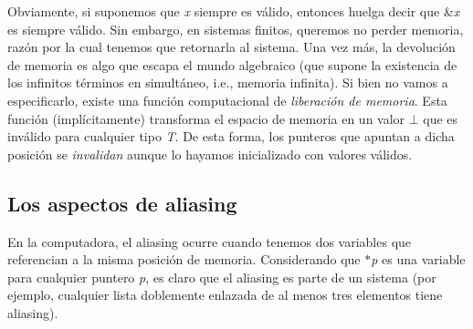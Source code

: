 \-Obviamente, si suponemos que {\itshape x\/} siempre es válido, entonces huelga decir que \&{\itshape x\/} es siempre válido. \-Sin embargo, en sistemas finitos, queremos no perder memoria, razón por la cual tenemos que retornarla al sistema. \-Una vez más, la devolución de memoria es algo que escapa el mundo algebraico (que supone la existencia de los infinitos términos en simultáneo, i.\-e., memoria infinita). \-Si bien no vamos a especificarlo, existe una función computacional de {\itshape liberación de memoria\/}. \-Esta función (implícitamente) transforma el espacio de memoria en un valor $\bot$ que es inválido para cualquier tipo {\itshape \-T\/}. \-De esta forma, los punteros que apuntan a dicha posición se {\itshape invalidan\/} aunque lo hayamos inicializado con valores válidos.\hypertarget{Aliasing_sec-aliasing}{}\subsection{\-Los aspectos de aliasing}\label{Aliasing_sec-aliasing}
\-En la computadora, el aliasing ocurre cuando tenemos dos variables que referencian a la misma posición de memoria. \-Considerando que $\ast${\itshape p\/} es una variable para cualquier puntero {\itshape p\/}, es claro que el aliasing es parte de un sistema (por ejemplo, cualquier lista doblemente enlazada de al menos tres elementos tiene aliasing).

